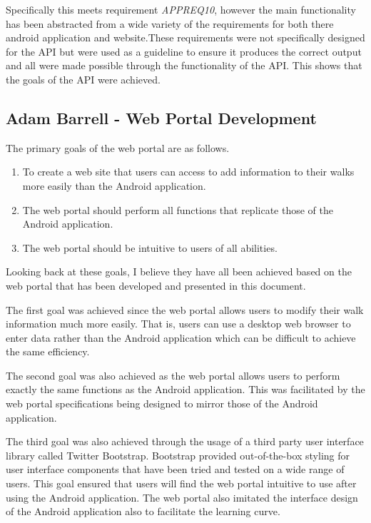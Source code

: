 \documentclass[11pt,a4paper]{report}
\begin{document}
Specifically this meets requirement  \emph{APPREQ10}, however the main functionality has been abstracted from a wide variety of the requirements  for both there android application and website.These requirements were not specifically designed for the API but were used as a guideline to ensure it produces the correct output and all were made possible through the functionality of the API. This shows that the goals of the API were achieved. 

\subsection{Adam Barrell - Web Portal Development}

The primary goals of the web portal are as follows.

\begin{enumerate}
\item To create a web site that users can access to add information to their walks more easily than the Android application.
\item The web portal should perform all functions that replicate those of the Android application.
\item The web portal should be intuitive to users of all abilities.
\end{enumerate}

Looking back at these goals, I believe they have all been achieved based on the web portal that has been developed and presented in this document.

The first goal was achieved since the web portal allows users to modify their walk information much more easily. That is, users can use a desktop web browser to enter data rather than the Android application which can be difficult to achieve the same efficiency.

The second goal was also achieved as the web portal allows users to perform exactly the same functions as the Android application. This was facilitated by the web portal specifications being designed to mirror those of the Android application.

The third goal was also achieved through the usage of a third party user interface library called Twitter Bootstrap. Bootstrap provided out-of-the-box styling for user interface components that have been tried and tested on a wide range of users. This goal ensured that users will find the web portal intuitive to use after using the Android application. The web portal also imitated the interface design of the Android application also to facilitate the learning curve.
\end{document}
